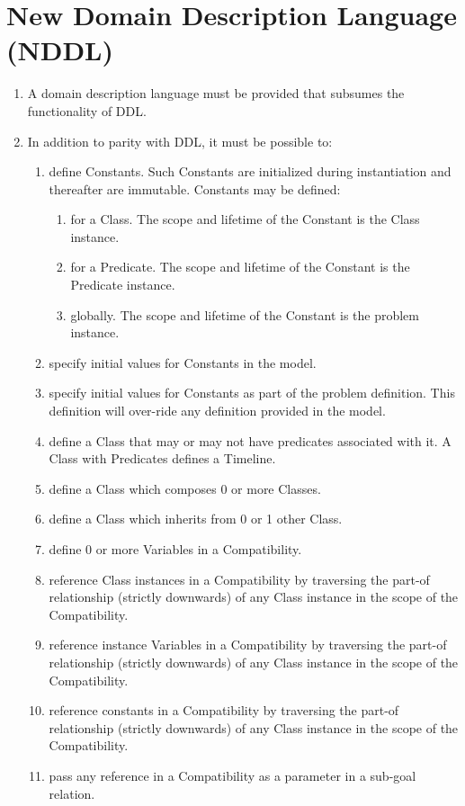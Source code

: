 \documentclass[twoside, 11pt]{article}
\begin{document}
\section{New Domain Description Language (NDDL)}
\begin{enumerate}
\item A domain description language must be provided that subsumes the functionality of DDL.
\item In addition to parity with DDL, it must be possible to:
\begin{enumerate}
\item define Constants. Such Constants are initialized during instantiation and thereafter are immutable. Constants may be defined:
\begin{enumerate}
\item for a Class. The scope and lifetime of the Constant is the Class instance.
\item for a Predicate. The scope and lifetime of the Constant is the Predicate instance.
\item globally. The scope and lifetime of the Constant is the problem instance.
\end{enumerate}
\item specify initial values for Constants in the model.
\item specify initial values for Constants as part of the problem definition. This definition will over-ride any definition provided in the model.
\item define a Class that may or may not have predicates associated with it. A Class with Predicates defines a Timeline.
\item define a Class which composes 0 or more Classes.
\item define a Class which inherits from 0 or 1 other Class.
\item define 0 or more Variables in a Compatibility.
\item reference Class instances in a Compatibility by traversing the part-of relationship (strictly downwards) of any Class instance in the scope of the Compatibility.
\item reference instance Variables in a Compatibility by traversing the part-of relationship (strictly downwards) of any Class instance in the scope of the Compatibility.
\item reference constants in a Compatibility by traversing the part-of relationship (strictly downwards) of any Class instance in the scope of the Compatibility.
\item pass any reference in a Compatibility as a parameter in a sub-goal relation.

\end{enumerate}
\end{enumerate}
\end{document}
